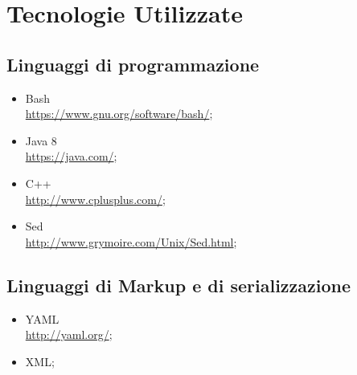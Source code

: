 \chapter{Tecnologie Utilizzate}

\section{Linguaggi di programmazione}
\begin{itemize}
 \item Bash	\\
 \href{https://www.gnu.org/software/bash/}{https://www.gnu.org/software/bash/};
 \item Java 8\\
 \href{https://java.com/}{https://java.com/};
 \item C++\\
 \href{http://www.cplusplus.com/}{http://www.cplusplus.com/};
 \item Sed\\
 \href{http://www.grymoire.com/Unix/Sed.html}{http://www.grymoire.com/Unix/Sed.html};
\end{itemize}

\section{Linguaggi di Markup e di serializzazione}
\begin{itemize}
 \item YAML\\
 \href{http://yaml.org/}{http://yaml.org/};
 \item XML;
\end{itemize}

